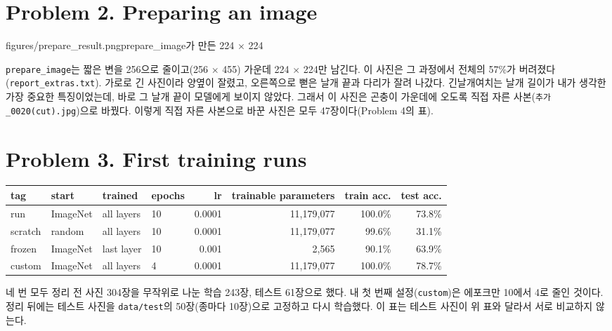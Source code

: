 \documentclass[11pt]{article}
\begin{document}
\section*{Problem 2. Preparing an image}

           {figures/prepare_result.png}{prepare\_image가 만든 224 $\times$ 224}

\texttt{prepare\_image}는 짧은 변을 256으로 줄이고(256 $\times$ 455) 가운데 224 $\times$ 224만 남긴다. 이 사진은 그 과정에서 전체의 57\%가 버려졌다(\texttt{report\_extras.txt}). 가로로 긴 사진이라 양옆이 잘렸고, 오른쪽으로 뻗은 날개 끝과 다리가 잘려 나갔다. 긴날개여치는 날개 길이가 내가 생각한 가장 중요한 특징이었는데, 바로 그 날개 끝이 모델에게 보이지 않았다. 그래서 이 사진은 곤충이 가운데에 오도록 직접 자른 사본(\texttt{추가\_0020(cut).jpg})으로 바꿨다. 이렇게 직접 자른 사본으로 바꾼 사진은 모두 47장이다(Problem 4의 표).

\section*{Problem 3. First training runs}

\begin{center}\footnotesize
\begin{tabular}{llllrrrr}
\toprule
tag & start & trained & epochs & lr & trainable parameters & train acc. & test acc. \\
\midrule
run & ImageNet & all layers & 10 & 0.0001 & 11,179,077 & 100.0\% & 73.8\% \\
scratch & random & all layers & 10 & 0.0001 & 11,179,077 & 99.6\% & 31.1\% \\
frozen & ImageNet & last layer & 10 & 0.001 & 2,565 & 90.1\% & 63.9\% \\
custom & ImageNet & all layers & 4 & 0.0001 & 11,179,077 & 100.0\% & 78.7\% \\
\bottomrule
\end{tabular}
\end{center}
네 번 모두 정리 전 사진 304장을 무작위로 나눈 학습 243장, 테스트 61장으로 했다. 내 첫 번째 설정(\texttt{custom})은 에포크만 10에서 4로 줄인 것이다. 정리 뒤에는 테스트 사진을 \texttt{data/test}의 50장(종마다 10장)으로 고정하고 다시 학습했다. 이 표는 테스트 사진이 위 표와 달라서 서로 비교하지 않는다.
\end{document}
